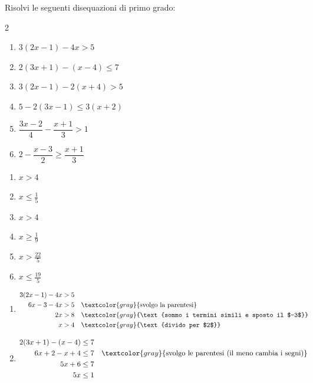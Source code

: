 \begin{question}[ID=1.4, subtitle={Disequazioni di primo grado con parentesi e frazioni}, difficulty=difficile, tags={disequazioni lineari}]
Risolvi le seguenti disequazioni di primo grado:
\begin{multicols}{2}
\begin{enumerate}[leftmargin=3.2cm]
    \item $3(2x - 1) - 4x > 5$
    \item $2(3x + 1) - (x - 4) \leq 7$
    \item $3(2x-1)-2(x+4)>5$
    \item $5-2(3x-1)\leq 3(x+2)$
    \item $\dfrac{3x-2}{4}-\dfrac{x+1}{3}>1$
    \item $2-\dfrac{x-3}{2}\geq\dfrac{x+1}{3}$
\end{enumerate}
\end{multicols}
\begin{solution}
\begin{enumerate}
    \item $x>4$
    \item $x\leq\tfrac{1}{5}$
    \item $x>4$
    \item $x\geq\tfrac{1}{9}$
    \item $x>\tfrac{22}{5}$
    \item $x\leq\tfrac{19}{5}$
\end{enumerate}
\end{solution}
\begin{explanation}
\begin{enumerate}
    \item \[\begin{aligned}
    3(2x-1)-4x &> 5\\
    6x-3-4x &> 5 && \textcolor{gray}{\text{svolgo la parentesi}}\\
    2x &> 8 && \textcolor{gray}{\text{sommo i termini simili e sposto il $-3$}}\\
    x &> 4 && \textcolor{gray}{\text{divido per $2$}}
    \end{aligned}\]
    \item \[\begin{aligned}
    2(3x+1)-(x-4) &\leq 7\\
    6x+2-x+4 &\leq 7 && \textcolor{gray}{\text{svolgo le parentesi (il meno cambia i segni)}}\\
    5x+6 &\leq 7\\
    5x &\leq 1\\

\end{aligned}\]
\end{enumerate}
\end{explanation}
\end{question}
